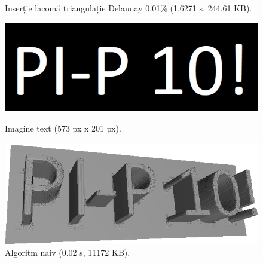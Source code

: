 \documentclass[12pt]{article}
\begin{document}
\begin{figure}[!htb]
\begin{minipage}{0.24\textwidth}
		\caption{Inserție lacomă triangulație Delaunay 0.01\% (1.6271 s, 244.61 KB).}\label{fig:fig22}
	\end{minipage}\hfill
        \begin{minipage}{0.24\textwidth}
		\centering
		\includegraphics[width=.95\linewidth]{Text/TextImg.jpg}
		\caption{Imagine text (573 px x 201 px).}\label{fig:fig23}
	\end{minipage}\hfill
        \begin{minipage}{0.24\textwidth}
		\centering
		\includegraphics[width=.95\linewidth]{Text/TextNaiv.png}
		\caption{Algoritm naiv (0.02 s, 11172 KB).}\label{fig:fig24}
	\end{minipage}\hfill
\end{figure}
\end{document}
